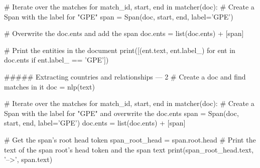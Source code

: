 # Iterate over the matches
for match_id, start, end in matcher(doc):
    # Create a Span with the label for "GPE"
    span = Span(doc, start, end, label='GPE')

    # Overwrite the doc.ents and add the span
    doc.ents = list(doc.ents) + [span]
    
# Print the entities in the document
print([(ent.text, ent.label_) for ent in doc.ents if ent.label_ == 'GPE'])


##### Extracting countries and relationships  --- 2
# Create a doc and find matches in it
doc = nlp(text)

# Iterate over the matches
for match_id, start, end in matcher(doc):
    # Create a Span with the label for "GPE" and overwrite the doc.ents
    span = Span(doc, start, end, label='GPE')
    doc.ents = list(doc.ents) + [span]
    
    # Get the span's root head token
    span_root_head = span.root.head
    # Print the text of the span root's head token and the span text
    print(span_root_head.text, '-->', span.text)
    
    
